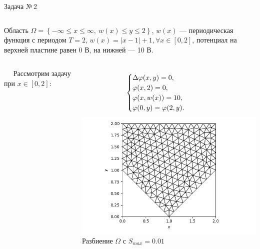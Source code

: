 \documentclass[ignoreonframetext,xcolor=table, unicode, 10pt]{beamer}
\renewcommand{\phi}{\varphi}
\begin{document}
\begin{frame}{Задача №\,2}
	\normalsize
	\vspace*{2mm}
	\begin{columns}[]
		Область $\Omega = \left\{ -\infty \leqslant x \leqslant \infty, \  w(x) \leqslant y \leqslant 2 \right\}$, $w(x)$ --- периодическая функция с периодом $T = 2$, $w(x) = |x - 1| + 1, \forall x \in \left[ 0, 2 \right]$, 
		потенциал на верхней пластине равен 0 В, на нижней --- 10 В.
	
	\end{columns}
	\vspace*{5mm}
	\begin{columns}[]
		\ \ \! Рассмотрим задачу при $x \in \left[ 0, 2 \right]$:
		
		\begin{equation*}\hspace*{-10mm}
			\begin{cases}
				\Delta \phi (x, y)  = 0, \\
				\phi (x, 2) = 0, \\
				\phi (x, w(x)) = 10, \\
				\phi (0, y) = \phi (2, y).\\
			\end{cases}
		\end{equation*}
		\vspace*{-2mm}
		\centering \hspace*{-10mm}
		\includegraphics[width=1\columnwidth]{Test_domain_4_mesh001_calfem_net_1.png}\\
		\hspace*{-10mm} Разбиение $\Omega$ с $S_{max} = 0.01$
		

\end{columns}
\end{frame}
\end{document}
